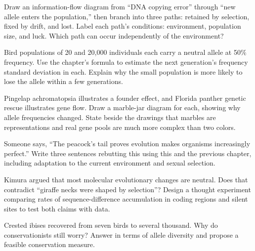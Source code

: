\begin{sikaoti}
\item Draw an information-flow diagram from ``DNA copying error'' through ``new allele enters the population,'' then branch into three paths: retained by selection, fixed by drift, and lost. Label each path's conditions: environment, population size, and luck. Which path can occur independently of the environment?
\item Bird populations of 20 and 20,000 individuals each carry a neutral allele at 50\% frequency. Use the chapter's formula to estimate the next generation's frequency standard deviation in each. Explain why the small population is more likely to lose the allele within a few generations.
\item Pingelap achromatopsia illustrates a founder effect, and Florida panther genetic rescue illustrates gene flow. Draw a marble-jar diagram for each, showing why allele frequencies changed. State beside the drawings that marbles are representations and real gene pools are much more complex than two colors.
\item Someone says, ``The peacock's tail proves evolution makes organisms increasingly perfect.'' Write three sentences rebutting this using this and the previous chapter, including adaptation to the current environment and sexual selection.
\item Kimura argued that most molecular evolutionary changes are neutral. Does that contradict ``giraffe necks were shaped by selection''? Design a thought experiment comparing rates of sequence-difference accumulation in coding regions and silent sites to test both claims with data.
\item Crested ibises recovered from seven birds to several thousand. Why do conservationists still worry? Answer in terms of allele diversity and propose a feasible conservation measure.
\end{sikaoti}
